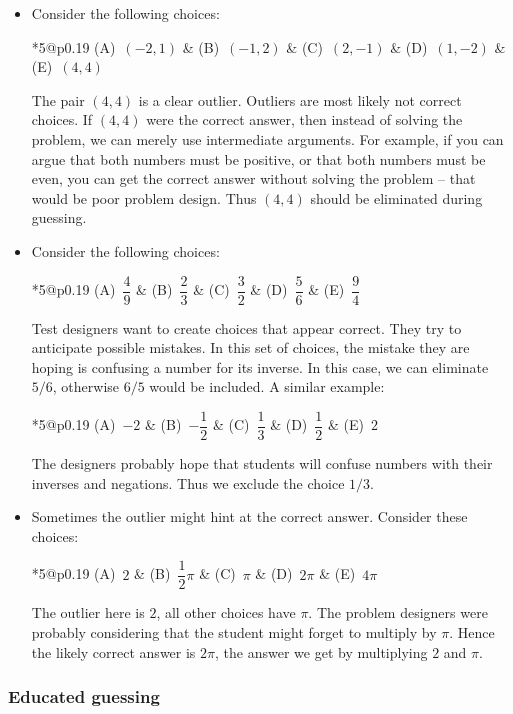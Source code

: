 \documentclass[10pt,paper=letter]{scrartcl}
\makeatletter
\newcommand{\fivech}[5]{
        \begin{tabular}{*{5}{@{}p{0.19\textwidth}}}
(A)~#1 & (B)~#2 & (C)~#3 & (D)~#4 & (E)~#5
        \end{tabular}}
\makeatother
\begin{document}
\begin{itemize}

\item Consider the following choices:

\fivech
{$(-2,1)$}
{$(-1,2)$}
{$(2,-1)$}
{$(1,-2)$}
{$(4,4)$}

The pair $(4,4)$ is a clear outlier. Outliers are most likely not correct choices. If $(4,4)$ were the correct answer, then instead of solving the problem, we can merely use intermediate arguments. For example, if you can argue that both numbers must be positive, or that both numbers must be even, you can get the correct answer without solving the problem -- that would be poor problem design. Thus $(4,4)$ should be eliminated during guessing.

\item Consider the following choices:

\fivech
{$\dfrac{4}{9}$}
{$\dfrac{2}{3}$}
{$\dfrac{3}{2}$}
{$\dfrac{5}{6}$}
{$\dfrac{9}{4}$}

Test designers want to create choices that appear correct. They try to anticipate possible mistakes. In this set of choices, the mistake they are hoping is confusing a number for its inverse. In this case, we can eliminate $5/6$, otherwise $6/5$ would be included. A similar example:

\fivech
{$-2$}
{$-\dfrac{1}{2}$}
{$\dfrac{1}{3}$}
{$\dfrac{1}{2}$}
{$2$}

The designers probably hope that students will confuse numbers with their inverses and negations. Thus we exclude the choice $1/3$.

\item Sometimes the outlier might hint at the correct answer. Consider these choices:

\fivech
{$2$}
{$\dfrac{1}{2}\pi$}
{$\pi$}
{$2\pi$}
{$4\pi$}

The outlier here is $2$, all other choices have $\pi$. The problem designers were probably considering that the student might forget to multiply by $\pi$. Hence the likely correct answer is $2\pi$, the answer we get by multiplying $2$ and $\pi$.

\end{itemize}

\subsubsection*{Educated guessing}
\end{document}
